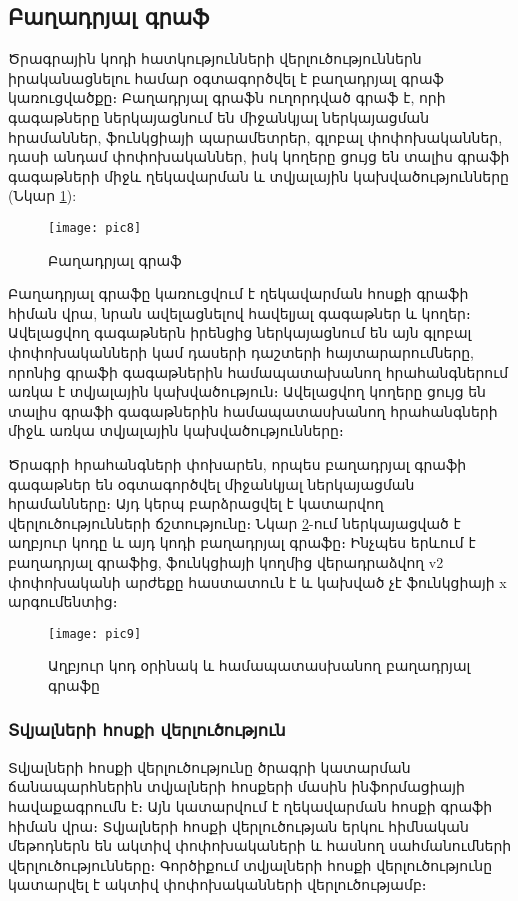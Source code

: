 {
	\subsection{Բաղադրյալ գրաֆ}\label{subsec:proceduregraph}
	Ծրագրային կոդի հատկությունների վերլուծություններն իրականացնելու համար օգտագործվել է բաղադրյալ գրաֆ կառուցվածքը։
	Բաղադրյալ գրաֆն ուղորդված գրաֆ է, որի գագաթները ներկայացնում են միջանկյալ ներկայացման   հրամաններ, ֆունկցիայի պարամետրեր,
	գլոբալ փոփոխականներ, դասի անդամ փոփոխականներ, իսկ կողերը ցույց են տալիս գրաֆի գագաթների միջև ղեկավարման և
	տվյալային կախվածությունները (Նկար \ref{fig:figure8}):

	\begin{figure}[h]
		\centering
		\texttt{[image: pic8]}
		\caption{Բաղադրյալ գրաֆ}
		\label{fig:figure8}
	\end{figure}

	Բաղադրյալ գրաֆը կառուցվում է ղեկավարման հոսքի գրաֆի հիման վրա, նրան ավելացնելով հավելյալ գագաթներ և կողեր։
	Ավելացվող գագաթներն իրենցից ներկայացնում են այն գլոբալ փոփոխականների կամ դասերի դաշտերի հայտարարումները, որոնից
	գրաֆի գագաթներին համապատախանող հրահանգներում առկա է տվյալային կախվածություն։ Ավելացվող կողերը ցույց են տալիս գրաֆի
	գագաթներին համապատասխանող հրահանգների միջև առկա տվյալային կախվածությունները։

	Ծրագրի հրահանգների փոխարեն, որպես բաղադրյալ գրաֆի գագաթներ են օգտագործվել միջանկյալ ներկայացման հրամանները։
	Այդ կերպ բարձրացվել է կատարվող վերլուծությունների ճշտությունը։  Նկար \ref{fig:figure9}-ում ներկայացված է աղբյուր կոդը
	և այդ կոդի բաղադրյալ գրաֆը։ Ինչպես երևում է բաղադրյալ գրաֆից, ֆունկցիայի կողմից վերադրաձվող v2 փոփոխականի արժեքը
	հաստատուն է և կախված չէ ֆունկցիայի x արգումենտից։

	\begin{figure}[h]
		\centering
		\texttt{[image: pic9]}
		\caption{Աղբյուր կոդ օրինակ և համապատասխանող բաղադրյալ գրաֆը}
		\label{fig:figure9}
	\end{figure}

	\subsubsection{Տվյալների հոսքի վերլուծություն}
	
	Տվյալների հոսքի վերլուծությունը ծրագրի կատարման ճանապարհներին տվյալների հոսքերի մասին ինֆորմացիայի հավաքագրումն է։
	Այն կատարվում է ղեկավարման հոսքի գրաֆի հիման վրա։ Տվյալների հոսքի վերլուծության երկու հիմնական մեթոդներն են ակտիվ
	փոփոխակաների և հասնող սահմանումների\cite{aho} վերլուծությունները։ Գործիքում տվյալների հոսքի վերլուծությունը
	կատարվել է  ակտիվ փոփոխականների վերլուծությամբ։
	
}
